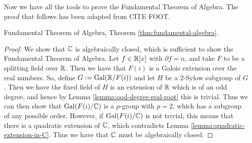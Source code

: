 Now we have all the tools to prove the Fundamental Theorem of Algebra. The proof that follows has been adapted from CITE FOOT.

\begin{theorem}
    Fundamental Theorem of Algebra, Theorem \ref{thm:fundamental-algebra}.
\end{theorem}


\begin{proof}
    We show that $\mathbb C$ is algebraically closed, which is sufficient to show the Fundamental Theorem of Algebra. Let $f \in \mathbb R[x]$ with $\partial f = n$, and take $F$ to be a splitting field over $\mathbb R$. Then we have that $F(i)$ is a Galois extension over the real numbers. So, define $G:=\operatorname{Gal}(\mathbb R/F(i))$ and let $H$ be a $2$-Sylow subgroup of $G$. Then we have the fixed field of $H$ is an extension of $\mathbb R$ which is of an odd degree, and hence by Lemma \ref{lemma:ood-degree-real-root} this is trivial. Thus we can then show that $\operatorname{Gal}(F(i)/\mathbb C)$ is a $p$-group with $p=2$, which has a subgroup of any possible order. However, if $\operatorname{Gal}(F(i)/\mathbb C)$ is not trivial, this means that there is a quadratic extension of $\mathbb C$, which contradicts Lemma \ref{lemma:quadratic-extension-in-C}. Thus we have that $\mathbb C$ must be algebraically closed.
\end{proof}
